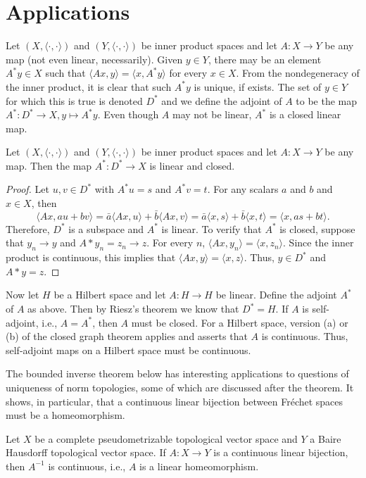 \section{Applications}
Let $(X,\langle\cdot,\cdot\rangle)$ and $(Y,\langle\cdot,\cdot\rangle)$ be inner product spaces and let $A:X\to Y$ be any map (not even linear, necessarily). Given $y\in Y$, there may be an element $A^*y\in X$ such that $\langle Ax,y\rangle=\langle x,A^*y\rangle$ for every $x\in X$. From the nondegeneracy of the inner product, it is clear that such $A^*y$ is unique, if exists. The set of $y\in Y$ for which this is true is denoted $D^*$ and we define the adjoint of $A$ to be the map $A^*:D^*\to X,y\mapsto A^*y$. Even though $A$ may not be linear, $A^*$ is a closed linear map.
\begin{proposition}\label{inner product space adjoint}
Let $(X,\langle\cdot,\cdot\rangle)$ and $(Y,\langle\cdot,\cdot\rangle)$ be inner product spaces and let $A:X\to Y$ be any map. Then the map $A^*:D^*\to X$ is linear and closed.
\end{proposition}
\begin{proof}
Let $u,v\in D^*$ with $A^*u=s$ and $A^*v=t$. For any scalars $a$ and $b$ and $x\in X$, then
\[\langle Ax,au+bv\rangle=\bar{a}\langle Ax,u\rangle+\bar{b}\langle Ax,v\rangle=\bar{a}\langle x,s\rangle+\bar{b}\langle x,t\rangle=\langle x,as+bt\rangle.\]
Therefore, $D^*$ is a subspace and $A^*$ is linear. To verify that $A^*$ is closed, suppose that $y_n\to y$ and $A*y_n=z_n\to z$. For every $n$, $\langle Ax,y_n\rangle=\langle x,z_n\rangle$. Since the inner product is continuous, this implies that $\langle Ax,y\rangle=\langle x,z\rangle$. Thus, $y\in D^*$ and $A*y=z$.
\end{proof}
Now let $H$ be a Hilbert space and let $A:H\to H$ be linear. Define the adjoint $A^*$ of $A$ as above. Then by Riesz's theorem we know that $D^*=H$. If $A$ is self-adjoint, i.e., $A=A^*$, then $A$ must be closed. For a Hilbert space, version (a) or (b) of the closed graph theorem applies and asserts that $A$ is continuous. Thus, self-adjoint maps on a Hilbert space must be continuous.\par
The bounded inverse theorem below has interesting applications to questions of uniqueness of norm topologies, some of which are discussed after the theorem. It shows, in particular, that a continuous linear bijection between Fr\'echet spaces must be a homeomorphism.
\begin{theorem}
Let $X$ be a complete pseudometrizable topological vector space and $Y$ a Baire Hausdorff topological vector space. If $A:X\to Y$ is a continuous linear bijection, then $A^{-1}$ is continuous, i.e., $A$ is a linear homeomorphism.
\end{theorem}
